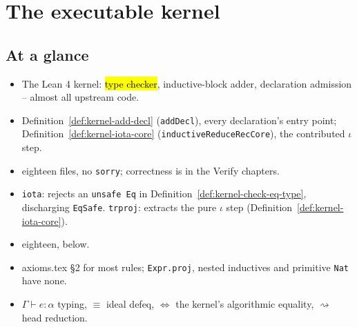 \chapter{The executable kernel}
\label{chap:kernel}

\section*{At a glance}
\begin{itemize}
\item {} The Lean 4 kernel: \hl{type checker}, inductive-block adder, declaration
admission -- almost all upstream code.
\item {} Definition~\ref{def:kernel-add-decl} (\texttt{addDecl}), every
declaration's entry point; Definition~\ref{def:kernel-iota-core}
(\texttt{inductiveReduceRecCore}), the contributed $\iota$ step.
\item {} \stProved{} eighteen files, no \texttt{sorry}; correctness is in the Verify
chapters.
\item {} \texttt{iota}: rejects an \texttt{unsafe Eq} in
Definition~\ref{def:kernel-check-eq-type}, discharging \texttt{EqSafe}. \texttt{trproj}: extracts
the pure $\iota$ step (Definition~\ref{def:kernel-iota-core}).
\item {} eighteen, below.
\item {} axioms.tex \S2 for most rules; \texttt{Expr.proj}, nested inductives and
primitive \texttt{Nat} have none.
\end{itemize}

\begin{itemize}
\item {} $\Gamma \vdash e:\alpha$ typing, $\equiv$ ideal defeq, $\Leftrightarrow$ the
kernel's algorithmic equality, $\rightsquigarrow$ head reduction.
\end{itemize}

